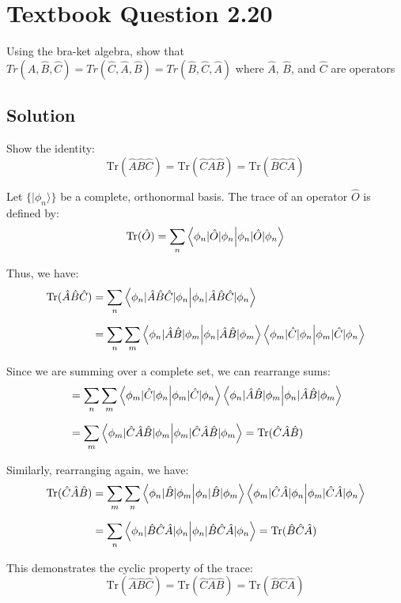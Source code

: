 \documentclass[12pt]{article}
\begin{document}
\section{Textbook Question 2.20}
    Using the bra-ket algebra, show that $Tr(\hat{A}, \hat{B}, \hat{C}) = Tr(\hat{C}, \hat{A}, \hat{B}) = Tr(\hat{B}, \hat{C}, \hat{A})$ where $\hat{A}$, $\hat{B}$, and $\hat{C}$ are operators
    
    \subsection{Solution}  
        Show the identity:
        \[
        \text{Tr}(\hat{A}\hat{B}\hat{C}) = \text{Tr}(\hat{C}\hat{A}\hat{B}) = \text{Tr}(\hat{B}\hat{C}\hat{A})
        \]

        Let \(\{|\phi_n\rangle\}\) be a complete, orthonormal basis. The trace of an operator \(\hat{O}\) is defined by:
        \[
        \text{Tr}(\hat{O}) = \sum_n \braket{\phi_n|\hat{O}|\phi_n}
        \]
        
        Thus, we have:
        \begin{align*}
        \text{Tr}(\hat{A}\hat{B}\hat{C}) &= \sum_n \braket{\phi_n|\hat{A}\hat{B}\hat{C}|\phi_n}\\[6pt]
        &= \sum_n \sum_m \braket{\phi_n|\hat{A}\hat{B}|\phi_m}\braket{\phi_m|\hat{C}|\phi_n}
        \end{align*}
        
        Since we are summing over a complete set, we can rearrange sums:
        \begin{align*}
        &= \sum_n \sum_m \braket{\phi_m|\hat{C}|\phi_n}\braket{\phi_n|\hat{A}\hat{B}|\phi_m}\\[6pt]
        &= \sum_m \braket{\phi_m|\hat{C}\hat{A}\hat{B}|\phi_m} = \text{Tr}(\hat{C}\hat{A}\hat{B})
        \end{align*}
        
        Similarly, rearranging again, we have:
        \begin{align*}
        \text{Tr}(\hat{C}\hat{A}\hat{B}) &= \sum_m \sum_n \braket{\phi_n|\hat{B}|\phi_m}\braket{\phi_m|\hat{C}\hat{A}|\phi_n}\\[6pt]
        &= \sum_n \braket{\phi_n|\hat{B}\hat{C}\hat{A}|\phi_n}=\text{Tr}(\hat{B}\hat{C}\hat{A})
        \end{align*}
        
        This demonstrates the cyclic property of the trace:
        \[
        \text{Tr}(\hat{A}\hat{B}\hat{C})=\text{Tr}(\hat{C}\hat{A}\hat{B})=\text{Tr}(\hat{B}\hat{C}\hat{A})
        \]
                  
\end{document}
